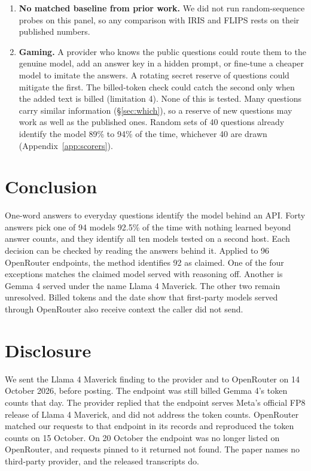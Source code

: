 \documentclass[11pt]{article}
\begin{document}
\begin{enumerate}
\item \textbf{No matched baseline from prior work.} We did not run random-sequence probes on this
panel, so any comparison with IRIS and FLIPS rests on their published numbers.
\item \textbf{Gaming.} A provider who knows the public questions could route them to the genuine
model, add an answer key in a hidden prompt, or fine-tune a cheaper model to imitate the answers.
A rotating secret reserve of questions could mitigate the first. The billed-token check could
catch the second only when the added text is billed (limitation 4). None of this is tested. Many
questions carry similar information (\S\ref{sec:which}), so a reserve of new questions may work as
well as the published ones. Random sets of 40 questions already identify the model 89\% to 94\% of
the time, whichever 40 are drawn (Appendix~\ref{app:scorers}).
\end{enumerate}

\section{Conclusion}

One-word answers to everyday questions identify the model behind an API. Forty answers pick one of
94 models 92.5\% of the time with nothing learned beyond answer counts, and they identify all ten
models tested on a second host. Each decision can be checked by reading the answers behind it. Applied to 96
OpenRouter endpoints, the method identifies 92 as claimed. One of the four exceptions matches the
claimed model served with reasoning off. Another is Gemma 4 served under the name Llama 4 Maverick.
The other two remain unresolved. Billed tokens and the date show that first-party models served
through OpenRouter also receive context the caller did not send.

\section*{Disclosure}

We sent the Llama 4 Maverick finding to the provider and to OpenRouter on 14 October 2026, before
posting. The endpoint was still billed Gemma 4's token counts that day. The provider replied that
the endpoint serves Meta's official FP8 release of Llama 4 Maverick, and did not address the token
counts. OpenRouter matched our requests to that endpoint in its records and reproduced the token
counts on 15 October. On 20 October the endpoint was no longer listed on OpenRouter, and requests pinned to it
returned not found. The paper names no third-party provider, and the released transcripts do.
\end{document}
